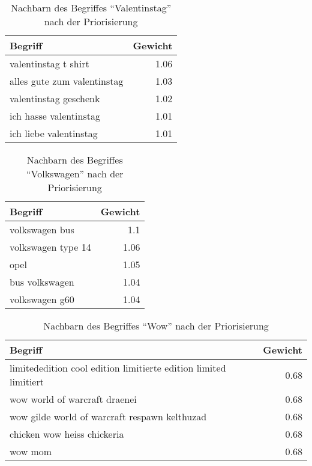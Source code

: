 \begin{table}
\centering
\begin{tabular*}{0.9\textwidth}{@{\extracolsep{\fill} } lr}
    \toprule
    Begriff & Gewicht \\
    \midrule
    valentinstag t shirt & \num{1.06} \\
    alles gute zum valentinstag & \num{1.03} \\
    valentinstag geschenk & \num{1.02} \\
    ich hasse valentinstag & \num{1.01} \\
    ich liebe valentinstag & \num{1.01} \\
    \bottomrule
\end{tabular*}
\caption{Nachbarn des Begriffes ``Valentinstag'' nach der Priorisierung}
\label{tab:prio_res_valentinstag}
\end{table}

\begin{table}
\centering
\begin{tabular*}{0.9\textwidth}{@{\extracolsep{\fill} } lr}
    \toprule
    Begriff & Gewicht \\
    \midrule
    volkswagen bus & \num{1.1} \\
    volkswagen type 14 & \num{1.06} \\
    opel & \num{1.05} \\
    bus volkswagen & \num{1.04} \\
    volkswagen g60 & \num{1.04} \\
    \bottomrule
\end{tabular*}
\caption{Nachbarn des Begriffes ``Volkswagen'' nach der Priorisierung}
\label{tab:prio_res_volkswagen}
\end{table}

\begin{table}
\centering
\begin{tabular*}{0.9\textwidth}{@{\extracolsep{\fill} } lr}
    \toprule
    Begriff & Gewicht \\
    \midrule
    limitededition cool edition limitierte edition limited limitiert & \num{0.68} \\
    wow world of warcraft draenei & \num{0.68} \\
    wow gilde world of warcraft respawn kelthuzad & \num{0.68} \\
    chicken wow heiss chickeria & \num{0.68} \\
    wow mom & \num{0.68} \\
    \bottomrule
\end{tabular*}
\caption{Nachbarn des Begriffes ``Wow'' nach der Priorisierung}
\label{tab:prio_res_wow}
\end{table}